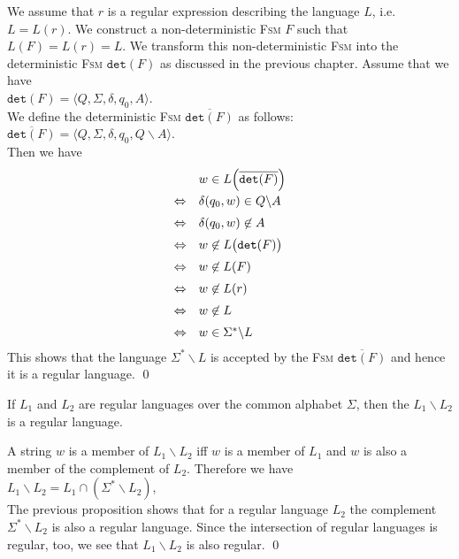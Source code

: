 \proofEng
We assume that $r$ is a regular expression describing the language $L$, i.e.~$L=L(r)$. 
We construct a non-deterministic \textsc{Fsm} $F$ such that $L(F) = L(r) = L$.  
We transform this non-deterministic \textsc{Fsm} into the deterministic \textsc{Fsm} $\mathtt{det}(F)$ as discussed
in the previous chapter.
Assume that we have
\\[0.2cm]
\hspace*{1.3cm} $\mathtt{det}(F) = \langle Q, \Sigma, \delta, q_0, A \rangle$.
\\[0.2cm]
We define the deterministic \textsc{Fsm} $\overline{\mathtt{det}(F)}$ as follows:
\\[0.2cm]
\hspace*{1.3cm} $\overline{\mathtt{det}(F)} = \langle Q, \Sigma, \delta, q_0, Q \backslash A \rangle$.
\\[0.2cm]
Then we have
$$
\begin{array}[t]{cl}
                  & w \in L\Bigl(\overline{\mathtt{det}(F)}\Bigr)                      \\[0.2cm]
  \Leftrightarrow & \delta(q_0, w) \in Q \backslash A     \\[0.2cm]
  \Leftrightarrow & \delta(q_0, w) \not\in A \\[0.2cm]
  \Leftrightarrow & w \not\in L\bigl(\mathtt{det}(F)\bigr) \\[0.2cm]
  \Leftrightarrow & w \not\in L(F) \\[0.2cm]
  \Leftrightarrow & w \not\in L(r) \\[0.2cm]
  \Leftrightarrow & w \not\in L \\[0.2cm]
  \Leftrightarrow & w \in \Sigma^* \backslash L 
 \end{array}
$$
This shows that the language $\Sigma^* \backslash L$ is accepted by the \textsc{Fsm} $\overline{\mathtt{det}(F)}$
and hence it is a regular language.
 \qed

\begin{Corollary} \label{kor:mengendif}
  If $L_1$ and $L_2$ are regular languages over the common alphabet $\Sigma$, then the 
   $L_1 \backslash L_2$  is a regular language.
\end{Corollary}

\proofEng
A string $w$ is a member of $L_1 \backslash L_2$ iff $w$ is a member of $L_1$
and $w$ is also a member of the complement of $L_2$.  Therefore we have
\\[0.2cm]
\hspace*{1.3cm}
$L_1 \backslash L_2 = L_1 \cap (\Sigma^* \backslash L_2)$,
\\[0.2cm]
The previous proposition shows that for a regular language $L_2$ the complement
$\Sigma^* \backslash L_2$ is also a regular language.  Since the intersection of regular languages is regular,
too, we see that $L_1 \backslash L_2$ is also regular.
\qed
\vspace*{0.3cm}

